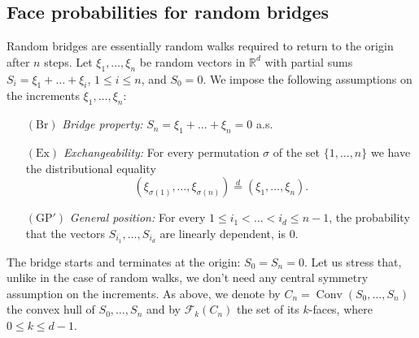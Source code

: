 \documentclass[12pt, reqno]{amsart}
\theoremstyle{plain}
\theoremstyle{definition}
\theoremstyle{remark}
\begin{document}
\subsection{Face probabilities for random bridges}
Random bridges are essentially random walks required to return to the origin after $n$ steps.
Let $\xi_1,\ldots,\xi_n$ be random vectors in ${\mathbb{R}}^d$ with partial sums $S_i= \xi_1+\ldots+\xi_i$, $1\leq i\leq n$, and $S_0=0$.
We impose the following assumptions on the increments $\xi_1,\ldots,\xi_n$:
\begin{itemize}
\item[$(\text{Br})$] \textit{Bridge property:} $S_n=\xi_1+\ldots+\xi_n = 0$ a.s.
\item[$(\text{Ex})$] \textit{Exchangeability:} For every permutation $\sigma$ of the set $\{1,\ldots,n\}$ we have the distributional equality
$$
(\xi_{\sigma(1)},\ldots,  \xi_{\sigma(n)}) {\stackrel{d}{=}} (\xi_1,\ldots,\xi_n).
$$
\item[$(\text{GP}')$] \textit{General position:}
For every $1\leq i_1 < \ldots < i_d \leq n-1$, the probability that the vectors $S_{i_1}, \ldots, S_{i_d}$ are linearly dependent, is $0$.
\end{itemize}
The bridge starts and terminates at the origin: $S_0=S_n =0$. Let us stress that, unlike in the case of random walks, we don't need any central symmetry  assumption on the increments. As above, we denote by $C_n= {\mathop{\mathrm{Conv}}\nolimits} (S_0,\ldots,S_n)$ the convex hull of $S_0,\ldots,S_n$ and by $\mathcal F_k(C_n)$ the set of its $k$-faces, where $0\leq k\leq d-1$.
\end{document}
